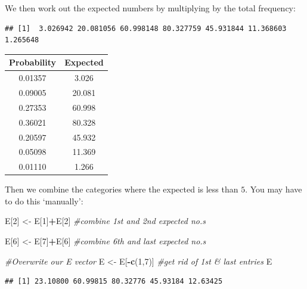 \documentclass[
]{book}
\newenvironment{Shaded}{\begin{snugshade}}{\end{snugshade}}
\newcommand{\CommentTok}[1]{\textcolor[rgb]{0.56,0.35,0.01}{\textit{#1}}}
\newcommand{\DecValTok}[1]{\textcolor[rgb]{0.00,0.00,0.81}{#1}}
\newcommand{\KeywordTok}[1]{\textcolor[rgb]{0.13,0.29,0.53}{\textbf{#1}}}
\newcommand{\NormalTok}[1]{#1}
\newcommand{\OperatorTok}[1]{\textcolor[rgb]{0.81,0.36,0.00}{\textbf{#1}}}
\newcommand{\StringTok}[1]{\textcolor[rgb]{0.31,0.60,0.02}{#1}}
\theoremstyle{definition}
\theoremstyle{definition}
\theoremstyle{definition}
\theoremstyle{definition}
\theoremstyle{remark}
\begin{document}
We then work out the expected numbers by multiplying by the total frequency:

\begin{Shaded}
\end{Shaded}

\begin{verbatim}
## [1]  3.026942 20.081056 60.998148 80.327759 45.931844 11.368603  1.265648
\end{verbatim}

\begin{longtable}[]{@{}cc@{}}
\toprule
Probability & Expected\tabularnewline
\midrule
\endhead
0.01357 & 3.026\tabularnewline
0.09005 & 20.081\tabularnewline
0.27353 & 60.998\tabularnewline
0.36021 & 80.328\tabularnewline
0.20597 & 45.932\tabularnewline
0.05098 & 11.369\tabularnewline
0.01110 & 1.266\tabularnewline
\bottomrule
\end{longtable}

Then we combine the categories where the expected is less than \(5\). You may have to do this `manually':

\begin{Shaded}
\begin{Highlighting}[]
\NormalTok{E[}\DecValTok{2}\NormalTok{] <-}\StringTok{ }\NormalTok{E[}\DecValTok{1}\NormalTok{]}\OperatorTok{+}\NormalTok{E[}\DecValTok{2}\NormalTok{] }\CommentTok{#combine 1st and 2nd expected no.s}

\NormalTok{E[}\DecValTok{6}\NormalTok{] <-}\StringTok{ }\NormalTok{E[}\DecValTok{7}\NormalTok{]}\OperatorTok{+}\NormalTok{E[}\DecValTok{6}\NormalTok{] }\CommentTok{#combine 6th and last expected no.s}

\CommentTok{#Overwrite our E vector}
\NormalTok{E <-}\StringTok{ }\NormalTok{E[}\OperatorTok{-}\KeywordTok{c}\NormalTok{(}\DecValTok{1}\NormalTok{,}\DecValTok{7}\NormalTok{)] }\CommentTok{#get rid of 1st & last entries}
\NormalTok{E}
\end{Highlighting}
\end{Shaded}

\begin{verbatim}
## [1] 23.10800 60.99815 80.32776 45.93184 12.63425
\end{verbatim}
\end{document}
